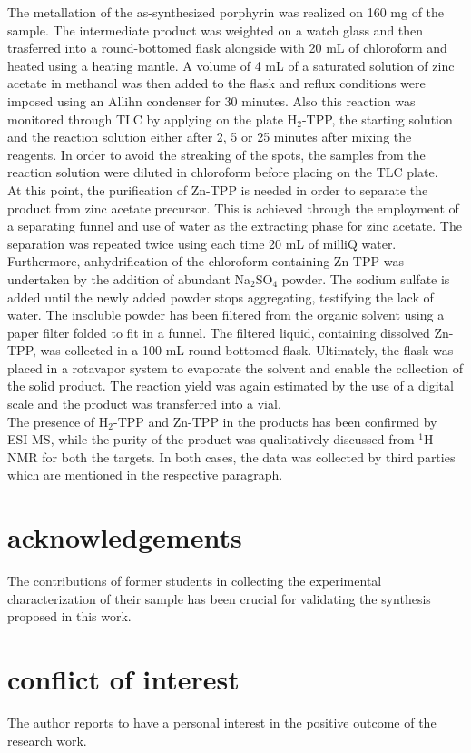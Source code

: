\documentclass[num-refs]{wiley-article}
\begin{document}
\break
The metallation of the as-synthesized porphyrin was realized on 160 mg of the sample.
The intermediate product was weighted on a watch glass and then trasferred into a round-bottomed flask alongside with 20 mL of chloroform and heated using a heating mantle.
A volume of 4 mL of a saturated solution of zinc acetate in methanol was then added to the flask and reflux conditions were imposed using an Allihn condenser for 30 minutes.
Also this reaction was monitored through TLC by applying on the plate H$_{2}$-TPP, the starting solution and the reaction solution either after 2, 5 or 25 minutes after mixing the reagents.
In order to avoid the streaking of the spots, the samples from the reaction solution were diluted in chloroform before placing on the TLC plate.\\
\break
At this point, the purification of Zn-TPP is needed in order to separate the product from zinc acetate precursor.
This is achieved through the employment of a separating funnel and use of water as the extracting phase for zinc acetate.
The separation was repeated twice using each time 20 mL of milliQ water.
Furthermore, anhydrification of the chloroform containing Zn-TPP was undertaken by the addition of abundant Na$_{2}$SO$_{4}$ powder.
The sodium sulfate is added until the newly added powder stops aggregating, testifying the lack of water.
The insoluble powder has been filtered from the organic solvent using a paper filter folded to fit in a funnel.
The filtered liquid, containing dissolved Zn-TPP, was collected in a 100 mL round-bottomed flask.
Ultimately, the flask was placed in a rotavapor system to evaporate the solvent and enable the collection of the solid product.
The reaction yield was again estimated by the use of a digital scale and the product was transferred into a vial.\\
The presence of H$_{2}$-TPP and Zn-TPP in the products has been confirmed by ESI-MS, while the purity of the product was qualitatively discussed from $^{1}$H NMR for both the targets.
In both cases, the data was collected by third parties which are mentioned in the respective paragraph.

\section*{acknowledgements}
The contributions of former students in collecting the experimental characterization of their sample has been crucial for validating the synthesis proposed in this work.
\section*{conflict of interest}
The author reports to have a personal interest in the positive outcome of the research work.
\end{document}
